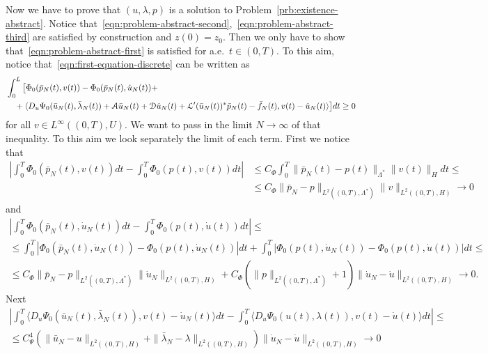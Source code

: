 \documentclass[a4paper,10pt,oneside]{amsbook}
\numberwithin{section}{chapter}
\numberwithin{equation}{chapter}
\theoremstyle{definition}
\DeclarePairedDelimiter{\dual}{\langle}{\rangle}
\begin{document}
Now we have to prove that $(u,\lambda,p)$ is a solution to Problem~\ref{prb:existence-abstract}. Notice that~\eqref{eqn:problem-abstract-second},~\eqref{eqn:problem-abstract-third} are satisfied by construction and $z(0)=z_0$. Then we only have to show that~\eqref{eqn:problem-abstract-first} is satisfied for a.e.\ $t\in(0,T)$. To this aim, notice that~\eqref{eqn:first-equation-discrete} can be written as
\begin{equation}
\label{eqn:inclusion-bochner-discrete}
\begin{multlined}
\int_0^L\big[\Phi_0(\bar{p}_N(t),v(t))-\Phi_0(\bar{p}_N(t),\dot u_N(t))+\\
+\dual{D_u\Psi_0(\bar u_N(t),\bar\lambda_N(t))+\mathcal{A}\bar u_N(t)+\mathcal{D}\dot u_N(t)+\mathcal{L}'(\bar u_N(t))^*\bar p_N(t)-\bar f_N(t),v(t)-\dot u_N(t)}\big]dt\ge0
\end{multlined}
\end{equation}
for all $v\in L^\infty((0,T),U)$. We want to pass in the limit $N\to\infty$ of that inequality. To this aim we look separately the limit of each term. First we notice that
\[
\begin{split}
\left|\int_0^T\Phi_0(\bar{p}_N(t),v(t))dt-\int_0^T\Phi_0(p(t),v(t))dt\right|
&\le C_\Phi\int_0^T\|\bar{p}_N(t)-p(t)\|_{\Lambda^*}\|v(t)\|_Hdt\le\\
&\le C_\Phi\|\bar{p}_N-p\|_{L^2((0,T),\Lambda^*)}\|v\|_{L^2((0,T),H)}\to0
\end{split}
\]
and
\[
\begin{multlined}
\left|\int_0^T\Phi_0(\bar{p}_N(t),\dot{u}_N(t))dt-\int_0^T\Phi_0(p(t),\dot{u}(t))dt\right|\le\\
\le\int_0^T\left|\Phi_0(\bar{p}_N(t),\dot{u}_N(t))-\Phi_0(p(t),\dot{u}_N(t))\right|dt+\int_0^T\left|\Phi_0(p(t),\dot{u}_N(t))-\Phi_0(p(t),\dot{u}(t))\right|dt\le\\
\le C_\Phi\|\bar{p}_N-p\|_{L^2((0,T),\Lambda^*)}\|\dot{u}_N\|_{L^2((0,T),H)}+C_\Phi(\|p\|_{L^2((0,T),\Lambda^*)}+1)\|\dot{u}_N-\dot{u}\|_{L^2((0,T),H)}\to0.
\end{multlined}
\]
Next
\[
\begin{multlined}
\left|\int_0^T\langle D_u\Psi_0(\bar{u}_N(t),\bar{\lambda}_N(t)),v(t)-\dot{u}_N(t)\rangle dt-\int_0^T\langle D_u\Psi_0(u(t),\lambda(t)),v(t)-\dot{u}(t)\rangle dt\right|\le\\
\le C_\Psi^4\left(\|\bar{u}_N-u\|_{L^2((0,T),H)}+\|\bar{\lambda}_N-\lambda\|_{L^2((0,T),H)}\right)\|\dot{u}_N-\dot{u}\|_{L^2((0,T),H)}\to0
\end{multlined}
\]
\end{document}
